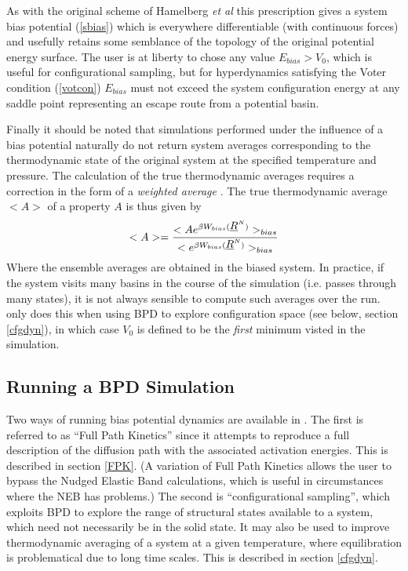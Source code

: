 As with the original scheme of Hamelberg {\em et al} \cite{hamelberg-04a} this
prescription gives a system bias potential (\ref{sbias}) which is everywhere
differentiable (with continuous forces) and usefully retains some semblance of
the topology of the original potential energy surface. The user is at liberty
to chose any value $E_{bias}>V_{0}$, which is useful for configurational
sampling, but for hyperdynamics satisfying the Voter condition (\ref{votcon})
$E_{bias}$ must not exceed the system configuration energy at any saddle point
representing an escape route from a potential basin.

Finally it should be noted that simulations performed under the
influence of a bias potential naturally do not return system averages
corresponding to the thermodynamic state of the original system
at the specified temperature and pressure. The calculation of the true
thermodynamic averages requires a correction in the form of a {\em
weighted average} \cite{hamelberg-04a}. The true thermodynamic average
$<A>$ of a property $A$ is thus given by
\begin{equation}
<A>=\frac{<Ae^{\beta W_{bias}(\mbox{$\underline{R}$}^{N})}>_{bias}}
{<e^{\beta W_{bias}(\mbox{$\underline{R}$}^{N})}>_{bias}} \label{cbias}
\end{equation}
Where the ensemble averages are obtained in the biased system.
In practice, if the system visits many basins in the course of the simulation
(i.e. passes through many states), it is not always sensible to compute such
averages over the run. \D{} only does this when using BPD to explore
configuration space (see below, section \ref{cfgdyn}), in which case $V_{0}$
is defined to be the {\em first} minimum visted in the simulation.

\subsection{Running a BPD Simulation}

Two ways of running bias potential dynamics are available in \D{}. The
first is referred to as ``Full Path Kinetics'' since it attempts to
reproduce a full description of the diffusion path with the associated
activation energies. This is described in section \ref{FPK}. (A variation of
Full Path Kinetics allows the user to bypass the Nudged Elastic Band
calculations, which is useful in circumstances where the NEB has problems.)
The second is ``configurational sampling'', which exploits BPD to explore
the range of structural states available to a system, which need not
necessarily be in the solid state. It may also be used to improve
thermodynamic averaging of a system at a given temperature, where
equilibration is problematical due to long time scales. This is
described in section \ref{cfgdyn}.

